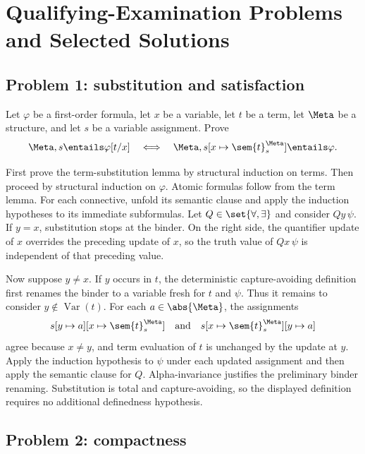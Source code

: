 \chapter{Qualifying-Examination Problems and Selected Solutions}
\label{ch:qualifying-problems}
\label{app:qualifying}

\section{Problem 1: substitution and satisfaction}
\label{sec:qualifying-problems-01}
\label{prob:substitution}

Let \(\varphi\) be a first-order formula, let \(x\) be a variable, let
\(t\) be a term, let
\(\Meta\) be a structure, and let \(s\) be a variable assignment.  Prove
\[
  \Meta,s\entails\varphi[t/x]
  \quad\Longleftrightarrow\quad
  \Meta,s[x\mapsto\sem{t}^{\Meta}_s]\entails\varphi.
\]

\begin{solution}
First prove the term-substitution lemma by structural induction on terms.  Then
proceed by structural induction on \(\varphi\).  Atomic formulas follow from
the term lemma.  For each connective, unfold its semantic clause and apply the
induction hypotheses to its immediate subformulas.  Let
\(Q\in\set{\forall,\exists}\) and consider \(Qy\,\psi\).  If \(y=x\),
substitution stops at the binder.  On the right side, the quantifier update of
\(x\) overrides the preceding update of \(x\), so the truth value of
\(Qx\,\psi\) is independent of that preceding value.

Now suppose \(y\neq x\).  If \(y\) occurs in \(t\), the deterministic
capture-avoiding definition first renames the binder to a variable fresh for
\(t\) and \(\psi\).  Thus it remains to consider
\(y\notin\operatorname{Var}(t)\).  For each \(a\in\abs{\Meta}\), the assignments
\[
  s[y\mapsto a][x\mapsto\sem{t}^{\Meta}_s]
  \quad\text{and}\quad
  s[x\mapsto\sem{t}^{\Meta}_s][y\mapsto a]
\]
agree because \(x\neq y\), and term evaluation of \(t\) is unchanged by the
update at \(y\).  Apply the induction hypothesis to \(\psi\) under each updated
assignment and then apply the semantic clause for \(Q\).  Alpha-invariance
justifies the preliminary binder renaming.  Substitution is total and
capture-avoiding, so the displayed definition requires no additional
definedness hypothesis.
\end{solution}

\section{Problem 2: compactness}
\label{sec:qualifying-problems-02}
\label{prob:compactness}

